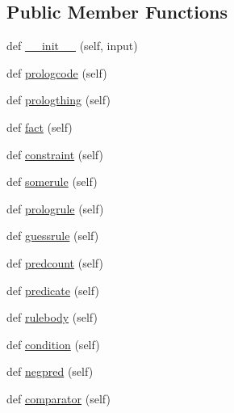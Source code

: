 \subsection*{Public Member Functions}
\begin{DoxyCompactItemize}
\item 
def \hyperlink{class_prolog_rules_parser_1_1_prolog_rules_parser_a5b5dedde829a4a6dc45c225465d3f51c}{\+\_\+\+\_\+init\+\_\+\+\_\+} (self, input)
\item 
def \hyperlink{class_prolog_rules_parser_1_1_prolog_rules_parser_ad1add6bc3c38625422bb746b40ba9dcc}{prologcode} (self)
\item 
def \hyperlink{class_prolog_rules_parser_1_1_prolog_rules_parser_a2882956c0c420c8508faeaca6bab3dee}{prologthing} (self)
\item 
def \hyperlink{class_prolog_rules_parser_1_1_prolog_rules_parser_ad6573773c7353080cc4423fefa2bf9c1}{fact} (self)
\item 
def \hyperlink{class_prolog_rules_parser_1_1_prolog_rules_parser_a619f24dbdfc7ec8a030f971789303611}{constraint} (self)
\item 
def \hyperlink{class_prolog_rules_parser_1_1_prolog_rules_parser_a1c80a3ef38bae5f3b1307bb4c23cd21a}{somerule} (self)
\item 
def \hyperlink{class_prolog_rules_parser_1_1_prolog_rules_parser_ad25635a83fec128ac019ba9e834ccd62}{prologrule} (self)
\item 
def \hyperlink{class_prolog_rules_parser_1_1_prolog_rules_parser_ab5d0165c626fa325700f2b9440ff5f95}{guessrule} (self)
\item 
def \hyperlink{class_prolog_rules_parser_1_1_prolog_rules_parser_a584d4ae09186dc19ae884b311f717c8d}{predcount} (self)
\item 
def \hyperlink{class_prolog_rules_parser_1_1_prolog_rules_parser_a3596b1ef3edd927166ea998f90122e54}{predicate} (self)
\item 
def \hyperlink{class_prolog_rules_parser_1_1_prolog_rules_parser_aaf735595570145e3eacf4d3784e68aa0}{rulebody} (self)
\item 
def \hyperlink{class_prolog_rules_parser_1_1_prolog_rules_parser_ac0b44714c95679b75feb5b4ef2f2ce48}{condition} (self)
\item 
def \hyperlink{class_prolog_rules_parser_1_1_prolog_rules_parser_a298c6fdda53250817c1537170a939091}{negpred} (self)
\item 
def \hyperlink{class_prolog_rules_parser_1_1_prolog_rules_parser_a1796c110404c167f207073d1310be900}{comparator} (self)
\item 

\end{DoxyCompactItemize}
